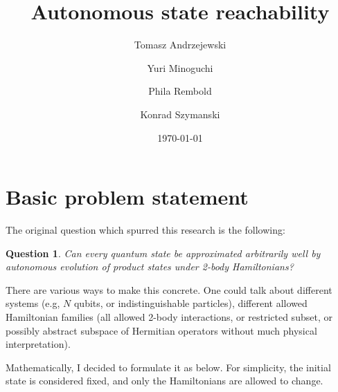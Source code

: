 \documentclass[ a4paper, 
                amsfonts, 
                amssymb, 
                amsmath, 
                reprint, 
                showkeys, 
                nofootinbib,
                superscriptaddress, 
                onecolumn, 
                notitlepage,
                aps,
                pra,
                longbibliography]{revtex4-1}
\newtheorem{question}{Question}
\theoremstyle{definition}
\begin{document}
\title{Autonomous state reachability}



\author{Tomasz Andrzejewski}

\author{Yuri Minoguchi}
\email{}


\author{Phila Rembold}
\email{}

\author{Konrad Szymanski}



\begin{abstract}

\end{abstract}

\date{\today}

\maketitle

\maketitle

\section{Basic problem statement}
The original question which spurred this research is the following: 
\begin{question}
Can every quantum state be approximated arbitrarily well by autonomous evolution of product states under 2-body Hamiltonians?
\end{question}
There are various ways to make this concrete. One could talk about different systems (e.g, $N$ qubits, or indistinguishable particles), different allowed Hamiltonian families (all allowed 2-body interactions, or restricted subset, or possibly abstract subspace of Hermitian operators without much physical interpretation).

Mathematically, I decided to formulate it as below. For simplicity, the initial state is considered fixed, and only the Hamiltonians are allowed to change.
\end{document}
